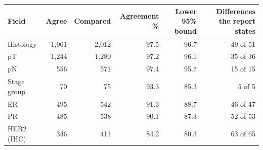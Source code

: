 \begin{tabular}{@{}lrrrrr@{}}
\toprule
Field & Agree & Compared & Agreement \% & Lower 95\% bound & Differences the report states \\
\midrule
Histology & 1,961 & 2,012 & 97.5 & 96.7 & 49 of 51 \\
pT & 1,244 & 1,280 & 97.2 & 96.1 & 35 of 36 \\
pN & 556 & 571 & 97.4 & 95.7 & 15 of 15 \\
Stage group & 70 & 75 & 93.3 & 85.3 & 5 of 5 \\
ER & 495 & 542 & 91.3 & 88.7 & 46 of 47 \\
PR & 485 & 538 & 90.1 & 87.3 & 52 of 53 \\
HER2 (IHC) & 346 & 411 & 84.2 & 80.3 & 63 of 65 \\
\bottomrule
\end{tabular}
